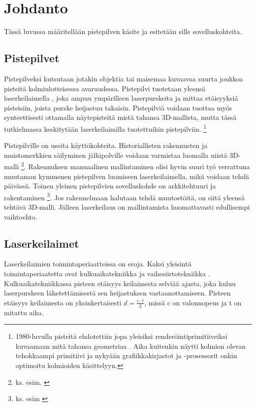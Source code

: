 \section{Johdanto}
Tässä luvussa määritellään pistepilven käsite ja esitetään sille sovelluskohteita.

\subsection{Pistepilvet}

Pistepilveksi kutsutaan jotakin objektia tai maisemaa kuvaavaa suurta joukkoa pisteitä kolmiulotteisessa avaruudessa. Pistepilvi tuotetaan yleensä laserkeilaimella , joka ampuu ympärilleen laserpurskeita ja mittaa etäisyyksiä pisteisiin, joista purske heijastuu takaisin. Pistepilviä voidaan tuottaa myös synteettisesti ottamalla näytepisteitä mistä tahansa 3D-mallista, mutta tässä tutkielmassa keskitytään laserkeilaimilla tuotettuihin pistepilviin. \footnote{1980-luvulla pisteitä ehdotettiin jopa yleisiksi renderöintiprimitiiveiksi kuvaamaan mitä tahansa geometriaa \cite{Whitted}. Aika kuitenkin näytti kolmion olevan tehokkaampi primitiivi ja nykyään grafiikkakirjastot ja -prosessorit onkin optimoitu kolmioiden käsittelyyn.}

Pistepilville on useita käyttökohteita. Historiallisten rakennusten ja muistomerkkien säilyminen jälkipolville voidaan varmistaa luomalla niistä 3D-malli \footnote{ks. esim. \cite{Kersten}}. Rakennuksen manuaalinen mallintaminen olisi hyvin suuri työ verrattuna muutaman kymmenen pistepilven luomiseen laserkeilaimella, mikä voidaan tehdä päivässä. Toinen yleinen pistepilvien sovelluskohde on arkkitehtuuri ja rakentaminen \footnote{ks. esim \cite{silta}}. Jos rakennelmaan halutaan tehdä muutostöitä, on siitä yleensä tehtävä 3D-malli. Jälleen laserkeilaus on mallintamista huomattavasti edullisempi vaihtoehto.

\subsection{Laserkeilaimet}

Laserkeilaimien toimintaperiaatteissa on eroja. Kaksi yleisintä toimintaperiaatetta ovat kulkuaikatekniikka  ja vaihesiirtotekniikka . Kulkuaikatekniikkassa pisteen etäisyys keilaimesta selviää ajasta, joka kuluu laserpurskeen lähetettämisestä sen heijastuksen vastaanottamiseen. Pisteen etäisyys keilaimesta on yksinkertaisesti $d=\frac{c\cdot t}{2}$, missä c on valonnopeus ja t on mitattu aika. \cite{fabritius}   

